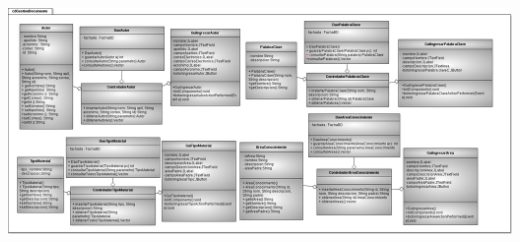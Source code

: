 \documentclass[11pt]{article}
\begin{document}
			\begin{minipage}[c]{1\linewidth}
				\centering
				\includegraphics[width=22cm, height=17cm,angle=90]{DiagramasClase/GestionDocumento}
			\end{minipage}	
		
\end{document}
